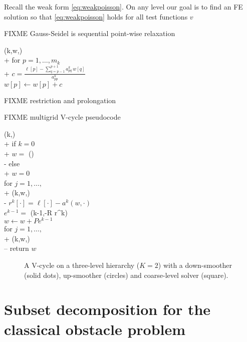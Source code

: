 \documentclass[letterpaper,final,12pt,reqno]{amsart}
\begin{document}
Recall the weak form \eqref{eq:weakpoisson}.  On any level our goal is to find an FE solution so that \eqref{eq:weakpoisson} holds for all test functions $v$



FIXME Gauss-Seidel is sequential point-wise relaxation

\begin{pseudo*}
(k,w,\ell)\text{:} \\+
    for $p=1,\dots,m_k$ \\+
        $\displaystyle c=\frac{\ell[p] - \sum_{q=p-1}^{p+1} a_{pq}^k \,w[q]}{a_{pp}^k}$ \quad {} \\
        $w[p] \gets w[p] + c$
\end{pseudo*}

FIXME restriction and prolongation

FIXME multigrid V-cycle pseudocode

\begin{pseudo*}
(k,\ell)\text{:} \\+
    if $k=0$ \\+
        $w =$ (\ell) \\-  %
    else \\+
        $w=0$ \\
        for $j=1,\dots,$ \\+
            (k,w,\ell) \\-
        $r^k[\cdot] = \ell[\cdot] - a^k(w,\cdot)$ \\
        $e^{k-1} =$ (k-1,-R r^k) \\
        $w \gets w + P e^{k-1}$ \\
        for $j=1,\dots,$ \\+
            (k,w,\ell) \\--
    return $w$
\end{pseudo*}

\begin{figure}

\caption{A V-cycle on a three-level hierarchy ($K=2$) with a down-smoother (solid dots), up-smoother (circles) and coarse-level solver (square).}
\label{fig:vcycle}
\end{figure}

\section{Subset decomposition for the classical obstacle problem} \label{sec:obstacle}
\end{document}
